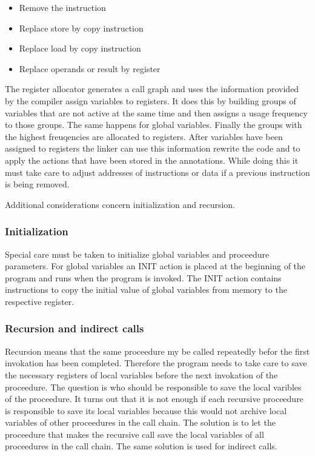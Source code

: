 \documentclass[a4paper,10pt]{article}
\begin{document}
\begin{itemize}
 \item {} Remove the instruction
 \item {}  Replace store by copy instruction
 \item {}   Replace load by copy instruction
 \item {} Replace operands or result by register
\end{itemize}

The register allocator generates a call graph and uses the information provided by the compiler assign variables to registers. It does
this by building groups of variables that are not active at the same time and then assigns a usage frequency to those groups. The same
happens for global variables. Finally the groups with the highest freuqencies are allocated to registers. After variables have been
assigned to registers the linker can use this information rewrite the code and to apply the actions that have been stored in the
annotations. While doing this it must take care to adjust addresses of instructions or data if a previous instruction is being removed.

Additional considerations concern initialization and recursion.

\subsubsection*{Initialization}
Special care must be taken to initialize global variables and proceedure parameters. For global variables an INIT action is placed at the
beginning of the program and runs when the program is invoked. The INIT action contains instructions to copy the initial value of global
variables from memory to the respective register.

\subsubsection*{Recursion and indirect calls}
Recursion means that the same proceedure my be called repeatedly befor the first invokation has been completed. Therefore the program
needs to take care to save the necessary registers of local variables before the next invokation of the proceedure. The question is who
should be responsible to save the local varibles of the proceedure. It turns out that it is not enough if each recursive proceedure is
responsible to save its local variables because this would not archive local variables of other proceedures in the call chain. The
solution is to let the proceedure that makes the recursive call save the local variables of all proceedures in the call chain. The same
solution is used for indirect calls.
\end{document}
